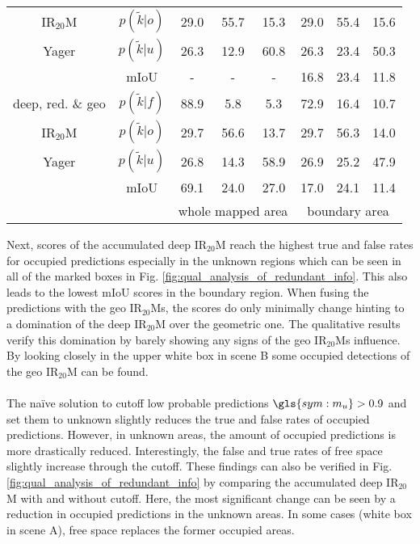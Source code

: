 \begin{center}
\begin{tabular}{c|c|ccc|ccc}
		IR$_{20}$M&$p(\tilde{k}|o)$ & \textcolor{myred}{29.0} & \textcolor{mygreen}{55.7} & 15.3& \textcolor{myred}{29.0} & \textcolor{mygreen}{55.4} & 15.6 \\
		Yager&$p(\tilde{k}|u)$ & 26.3 & 12.9 & 60.8& 26.3 & 23.4 & 50.3 \\
		& mIoU & - & - & - &16.8&23.4&11.8 \\
		\hline
		deep, red. \& geo&$p(\tilde{k}|f)$ & \textcolor{mygreen}{88.9} & \textcolor{myred}{5.8} & 5.3& \textcolor{mygreen}{72.9} & \textcolor{myred}{16.4} & 10.7 \\
		IR$_{20}$M&$p(\tilde{k}|o)$ & \textcolor{myred}{29.7} & \textcolor{mygreen}{56.6} & 13.7& \textcolor{myred}{29.7} & \textcolor{mygreen}{56.3} & 14.0 \\
		Yager&$p(\tilde{k}|u)$ & 26.8 & 14.3 & 58.9& 26.9 & 25.2 & 47.9 \\
		& mIoU &69.1&24.0&27.0&17.0&24.1&11.4 \\
		\hline
		& & \multicolumn{3}{c|}{whole mapped area} & \multicolumn{3}{c}{boundary area}
	\end{tabular}
\end{center}
Next, scores of the accumulated deep IR$_{20}$M reach the highest true and false rates for occupied predictions especially in the unknown regions which can be seen in all of the marked boxes in Fig. \ref{fig:qual_analysis_of_redundant_info}. This also leads to the lowest mIoU scores in the boundary region. When fusing the predictions with the geo IR$_{20}$Ms, the scores do only minimally change hinting to a domination of the deep IR$_{20}$M over the geometric one. The qualitative results verify this domination by barely showing any signs of the geo IR$_{20}$Ms influence. By looking closely in the upper white box in scene B some occupied detections of the geo IR$_{20}$M can be found.
\\\\
The na\"ive solution to cutoff low probable predictions $\gls{sym:m_u} > 0.9$ and set them to unknown slightly reduces the true and false rates of occupied predictions. However, in unknown areas, the amount of occupied predictions is more drastically reduced. Interestingly, the false and true rates of free space slightly increase through the cutoff. These findings can also be verified in Fig. \ref{fig:qual_analysis_of_redundant_info} by comparing the accumulated deep IR$_{20}$M with and without cutoff. Here, the most significant change can be seen by a reduction in occupied predictions in the unknown areas. In some cases (white box in scene A), free space replaces the former occupied areas.
